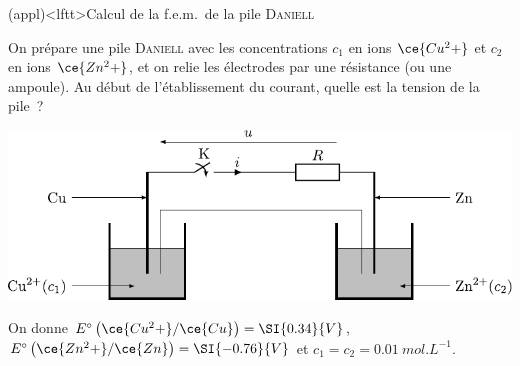 \documentclass[../../main/main.tex]{subfiles}
\begin{document}
\begin{tcb*}(appl)<lftt>{Calcul de la f.e.m.\ de la pile \textsc{Daniell}}
	\noindent
	\begin{minipage}[c]{.48\linewidth}
		On prépare une pile \textsc{Daniell} avec les concentrations $c_1$ en ions
		$\ce{Cu^2+}$ et $c_2$ en ions $\ce{Zn^2+}$, et on relie les électrodes par une
		résistance (ou une ampoule). Au début de l'établissement du courant, quelle
		est la tension de la pile~?
	\end{minipage}
	\hfill
	\begin{minipage}[c]{.48\linewidth}
		\vspace{0pt}
		\begin{center}
			\includegraphics[width=\linewidth]{pile_fem-R}
			\label{fig:fem_R}
		\end{center}
	\end{minipage}
	On donne $E^\circ \left( \ce{Cu^2+}/\ce{Cu} \right) = \SI{0.34}{V}$,
	$E^\circ \left( \ce{Zn^2+}/\ce{Zn} \right) = \SI{-0.76}{V}$ et $c_1 = c_2 =
		\SI{0.01}{mol.L^{-1}}$.
	\tcblower
	\vspace{-15pt}
	\vspace{-15pt}
\end{tcb*}
\end{document}
